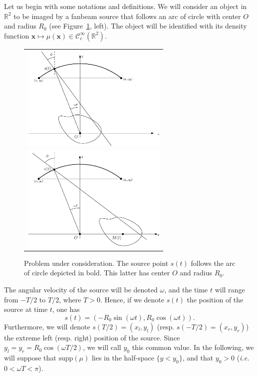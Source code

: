 \documentclass[9pt,technote]{IEEEtran}
\numberwithin{equation}{section}
\newcommand{\R}{\mathbb{R}}
\newcommand{\ie}{\emph{i.e.} }
\newcommand{\Ccinf}{\mathcal{C}_c^{\infty}}
\newcommand{\supp}{\textrm{supp}}
\begin{document}
Let us begin with some notations and definitions. We will consider an object in $\R^2$ to be imaged by a fanbeam source that follows an arc of circle with center $O$ and radius $R_0$ (see Figure~\ref{fig:notations}, left). The object will be identified with its density function $\mathbf{x} \mapsto \mu(\mathbf{x}) \in \Ccinf(\R^2)$.
\begin{figure}[!ht]
	\centering
	\begin{tabular}{c}
	\includegraphics[width=7cm]{figs/frame_scanner_still.eps} \\
	\includegraphics[width=7cm]{figs/frame_scanner.eps}
	\end{tabular}
	\caption{Problem under consideration. The source point $s(t)$ follows the arc of circle depicted in bold. This latter has center $O$ and radius $R_0$.\label{fig:notations}}
\end{figure}
The angular velocity of the source will be denoted $\omega$, and the time $t$ will range from $-T/2$ to $T/2$, where $T>0$. Hence, if we denote $s(t)$ the position of the source at time $t$, one has
\begin{equation}
	s(t) = \left( -R_0 \sin(\omega t), R_0 \cos(\omega t) \right).
\label{eq:source_position}
\end{equation}
Furthermore, we will denote $s(T/2)=(x_l,y_l)$ (resp. $s(-T/2)=(x_r,y_r)$) the extreme left (resp. right) position of the source. Since $y_l = y_r = R_0 \cos(\omega T/2)$, we will call $y_0$ this common value. In the following, we will suppose that $\supp(\mu)$ lies in the half-space $\{ y < y_0 \}$, and that $y_0 > 0$ (\ie $0 < \omega T < \pi$).
\end{document}
